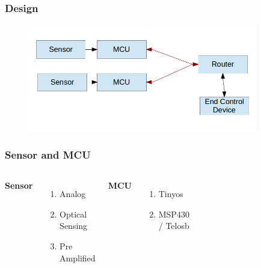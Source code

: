 \documentclass{beamer}
\begin{document}
\begin{frame}
\frametitle{Design}
\begin{figure}[H]
 \centering
 \includegraphics[width=10cm]{designc}
\end{figure}
\end{frame}


\begin{frame}
\frametitle{Sensor and MCU}
\begin{columns}[c] %

\textbf{Sensor}
\begin{enumerate}
\item Analog
\item Optical Sensing
\item Pre Amplified
\end{enumerate}
\textbf{MCU}
\begin{enumerate}
\item Tinyos
\item MSP430 / Telosb
\end{enumerate}

\begin{figure}[H]
 \centering
 \includegraphics[width=3cm]{sensor}
\end{figure}
\begin{figure}[H]
 \centering
 \includegraphics[width=3cm]{telos}
\end{figure}
\end{columns}
\end{frame}
\end{document}
